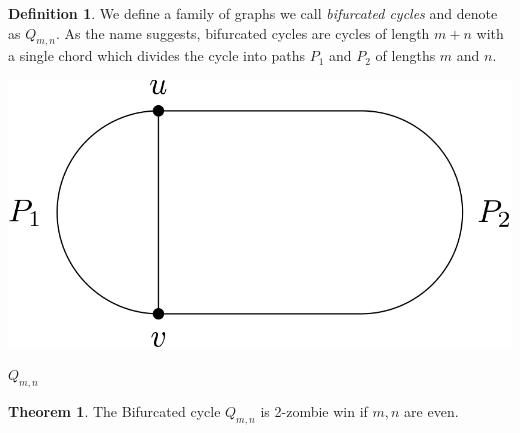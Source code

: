 \documentclass[letterpaper, 10pt]{article}
\begin{document}
\theoremstyle{definition}
\newtheorem{definition}{Definition}
\newtheorem{theorem}{Theorem}
\newtheorem{proposition}{Proposition}
\newtheorem{corollary}{Corollary}
\newtheorem{lemma}{Lemma}
\newtheorem{proofpart}{Part}
\makeatletter
{}
\makeatother

\begin{definition}
 We define a family of graphs we call \emph{bifurcated cycles} and denote as $Q_{m,n}$.
 As the name suggests, bifurcated cycles are cycles of length $m+n$ with a single chord
 which divides the cycle into paths $P_1$ and $P_2$ of lengths $m$ and $n$.
\end{definition}

\begin{center}
 \includegraphics[scale=0.20]{Q_m_n}

 $Q_{m,n}$
\end{center}

\begin{theorem}
The Bifurcated cycle $Q_{m,n}$ is 2-zombie win if $m, n$ are even.
\end{theorem}
\end{document}

